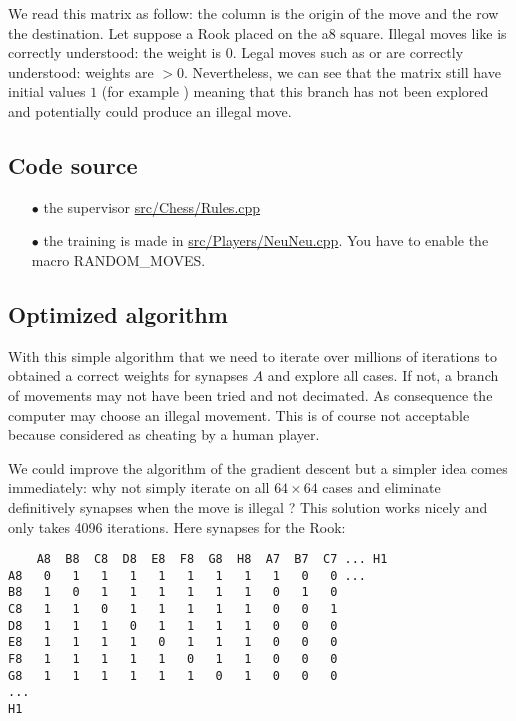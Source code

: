 \documentclass[a4paper,10pt]{article}
\begin{document}
We read this matrix as follow: the column is the origin of the move and the row
the destination. Let suppose a Rook placed on the a8 square. Illegal moves like
 is correctly understood: the weight is $0$. Legal moves such as
 or  are correctly understood: weights are
$>0$. Nevertheless, we can see that the matrix still have initial values $1$
(for example ) meaning that this branch has not been explored and
potentially could produce an illegal move.

\subsection{Code source}

\begin{itemize}
\item[$\bullet$] the supervisor
\href{https://github.com/Lecrapouille/ChessNeuNeu/blob/master/src/Chess/Rules.cpp}{src/Chess/Rules.cpp}
\item[$\bullet$] the training is made in \href{https://github.com/Lecrapouille/ChessNeuNeu/blob/master/src/Players/NeuNeu.cpp}{src/Players/NeuNeu.cpp}.
  You have to enable the macro RANDOM\_MOVES.
\end{itemize}

\subsection{Optimized algorithm}

With this simple algorithm that we need to iterate over millions of iterations
to obtained a correct weights for synapses $A$ and explore all cases. If not, a
branch of movements may not have been tried and not decimated. As consequence
the computer may choose an illegal movement. This is of course not acceptable
because considered as cheating by a human player.

We could improve the algorithm of the gradient descent but a simpler idea comes
immediately: why not simply iterate on all $64 \times 64$ cases and eliminate
definitively synapses when the move is illegal ? This solution works nicely and
only takes 4096 iterations. Here synapses for the Rook:

\begin{verbatim}
    A8  B8  C8  D8  E8  F8  G8  H8  A7  B7  C7 ... H1
A8   0   1   1   1   1   1   1   1   1   0   0 ...
B8   1   0   1   1   1   1   1   1   0   1   0
C8   1   1   0   1   1   1   1   1   0   0   1
D8   1   1   1   0   1   1   1   1   0   0   0
E8   1   1   1   1   0   1   1   1   0   0   0
F8   1   1   1   1   1   0   1   1   0   0   0
G8   1   1   1   1   1   1   0   1   0   0   0
...
H1
\end{verbatim}
\end{document}
